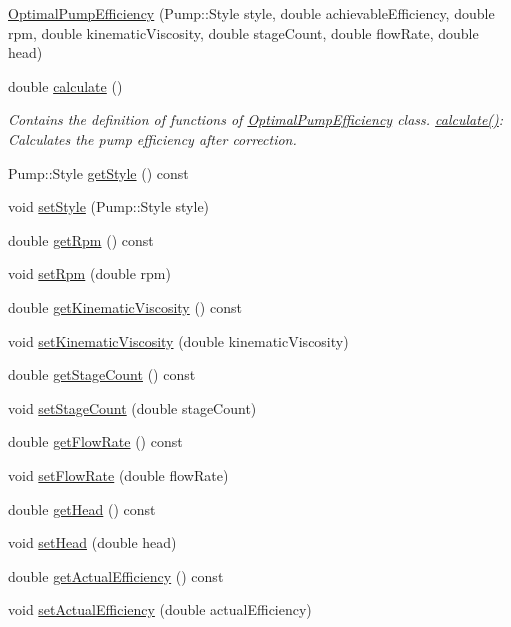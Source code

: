 \begin{DoxyCompactItemize}
\item 
\hyperlink{class_optimal_pump_efficiency_ae07626ea079ff810ac6518d54c52b24a}{Optimal\+Pump\+Efficiency} (Pump\+::\+Style style, double achievable\+Efficiency, double rpm, double kinematic\+Viscosity, double stage\+Count, double flow\+Rate, double head)
\item 
double \hyperlink{class_optimal_pump_efficiency_ac40720d1fcdf40d8b364df37e58e7f4d}{calculate} ()
\begin{DoxyCompactList}\small\item\em Contains the definition of functions of \hyperlink{class_optimal_pump_efficiency}{Optimal\+Pump\+Efficiency} class. \hyperlink{class_optimal_pump_efficiency_ac40720d1fcdf40d8b364df37e58e7f4d}{calculate()}\+: Calculates the pump efficiency after correction. \end{DoxyCompactList}\item 
Pump\+::\+Style \hyperlink{class_optimal_pump_efficiency_a601fe15e9acc23112743fabe417030fb}{get\+Style} () const
\item 
void \hyperlink{class_optimal_pump_efficiency_ab6b85c8c08d6641c5375c65436f16a2f}{set\+Style} (Pump\+::\+Style style)
\item 
double \hyperlink{class_optimal_pump_efficiency_a58e8a430ced612e0518abd07fb30b085}{get\+Rpm} () const
\item 
void \hyperlink{class_optimal_pump_efficiency_afc6b6f46b4e289efc8819249ad1c9fb5}{set\+Rpm} (double rpm)
\item 
double \hyperlink{class_optimal_pump_efficiency_a8c2f7fcacce2b42ed83f29aec2d4671e}{get\+Kinematic\+Viscosity} () const
\item 
void \hyperlink{class_optimal_pump_efficiency_a00017e0bd100beb2f4b0bf2db5e3687f}{set\+Kinematic\+Viscosity} (double kinematic\+Viscosity)
\item 
double \hyperlink{class_optimal_pump_efficiency_aac0c1a4a6492bf00b245c2a61d100eaa}{get\+Stage\+Count} () const
\item 
void \hyperlink{class_optimal_pump_efficiency_a5b0b2a24a87c1c8fc92aa96c6ba4b727}{set\+Stage\+Count} (double stage\+Count)
\item 
double \hyperlink{class_optimal_pump_efficiency_a77c6618681b0fd3a0fc02dc49d16ee99}{get\+Flow\+Rate} () const
\item 
void \hyperlink{class_optimal_pump_efficiency_a90067b57c559fd3274fb8d6e00f6221d}{set\+Flow\+Rate} (double flow\+Rate)
\item 
double \hyperlink{class_optimal_pump_efficiency_af31fdb10aabc197ff7536c9bbe006573}{get\+Head} () const
\item 
void \hyperlink{class_optimal_pump_efficiency_ac317c900ec68797cf051977147ea33da}{set\+Head} (double head)
\item 
double \hyperlink{class_optimal_pump_efficiency_aa2ac8a7c61bc28f82e30cb44b9c21008}{get\+Actual\+Efficiency} () const
\item 
void \hyperlink{class_optimal_pump_efficiency_a539b20c53c7ba6a5983a60d74be4ac9e}{set\+Actual\+Efficiency} (double actual\+Efficiency)
\end{DoxyCompactItemize}



